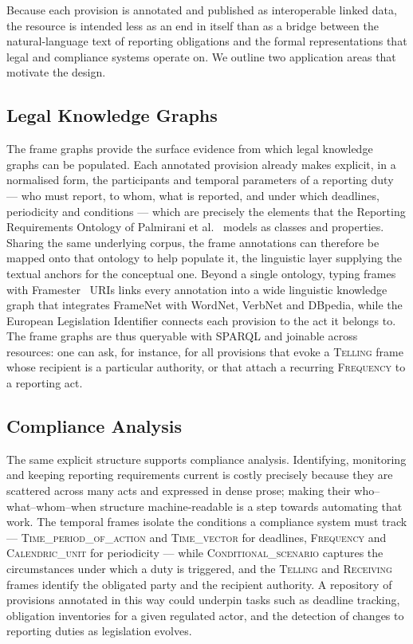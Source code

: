 \documentclass[10pt, a4paper, twocolumn]{article}
\begin{document}
Because each provision is annotated and published as interoperable linked data,
the resource is intended less as an end in itself than as a bridge between the
natural-language text of reporting obligations and the formal representations
that legal and compliance systems operate on. We outline two application areas
that motivate the design.

\subsection{Legal Knowledge Graphs}

The frame graphs provide the surface evidence from which legal knowledge graphs
can be populated. Each annotated provision already makes explicit, in a
normalised form, the participants and temporal parameters of a reporting duty ---
who must report, to whom, what is reported, and under which deadlines, periodicity
and conditions --- which are precisely the elements that the Reporting
Requirements Ontology of Palmirani et al.~\cite{palmirani-2025-reporting} models
as classes and properties. Sharing the same underlying corpus, the frame
annotations can therefore be mapped onto that ontology to help populate it, the
linguistic layer supplying the textual anchors for the conceptual one. Beyond a
single ontology, typing frames with Framester~\cite{gangemi2016framester} URIs
links every annotation into a wide linguistic knowledge graph that integrates
FrameNet with WordNet, VerbNet and DBpedia, while the European Legislation
Identifier connects each provision to the act it belongs to. The frame graphs are
thus queryable with SPARQL and joinable across resources: one can ask, for
instance, for all provisions that evoke a \textsc{Telling} frame whose recipient
is a particular authority, or that attach a recurring \textsc{Frequency} to a
reporting act.

\subsection{Compliance Analysis}

The same explicit structure supports compliance analysis. Identifying, monitoring
and keeping reporting requirements current is costly precisely because they are
scattered across many acts and expressed in dense prose; making their
who--what--whom--when structure machine-readable is a step towards automating that
work. The temporal frames isolate the conditions a compliance system must track ---
\textsc{Time\_period\_of\_action} and \textsc{Time\_vector} for deadlines,
\textsc{Frequency} and \textsc{Calendric\_unit} for periodicity --- while
\textsc{Conditional\_scenario} captures the circumstances under which a duty is
triggered, and the \textsc{Telling} and \textsc{Receiving} frames identify the
obligated party and the recipient authority. A repository of provisions annotated
in this way could underpin tasks such as deadline tracking, obligation inventories
for a given regulated actor, and the detection of changes to reporting duties as
legislation evolves.
\end{document}
